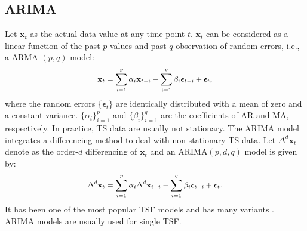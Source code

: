 \documentclass[letterpaper]{article} %
\numberwithin{theorem}{section}
\begin{document}
\subsection{ARIMA}

Let  $\mathbf x_t$ as the actual data value at any time point  $t$.   $\mathbf x_t$ can be considered as a linear function of the past $p$  values and  past  $q$ observation of random errors, i.e., a   ARMA $(p,q)$ model:  
\begin{equation}\label{eq:arma} 
\small
\begin{aligned}
\mathbf x_t = \sum_{i=1}^{p}\alpha_i \mathbf x_{t-i} -  \sum_{i=1}^{q}  \beta_i \boldsymbol  \epsilon_{t-i}   +  \boldsymbol \epsilon_t,  
\end{aligned}  
\end{equation}
where  the  random errors $\{\boldsymbol \epsilon_t\}$ are identically distributed with a mean of zero and a constant variance. 
$\{\alpha_i\}_{i=1}^{p}$ and $ \{\beta_i \}_{i=1}^{q}$ are the coefficients  of AR and MA, respectively.  
In practice, TS data are usually not  stationary. The ARIMA model integrates a differencing method to deal with non-stationary TS data. 
Let  $\Delta^d \mathbf x_t $ denote as the  order-$d$  differencing  of $ \mathbf x_t$ and  an ARIMA$(p,d,q)$ model is given by:
\begin{equation}\label{eq:arima} 
\small 
\begin{aligned}
\Delta^d  \mathbf x_t = \sum_{i=1}^{p}\alpha_i \Delta^d  \mathbf x_{t-i} -  \sum_{i=1}^{q}  \beta_i \boldsymbol  \epsilon_{t-i}   +  \boldsymbol \epsilon_t.  
\end{aligned} 
\end{equation}
It  has been one of the most popular TSF models and has  many variants  \cite{zhang2003time,khashei2011novel,liu2016online}.  ARIMA models are usually used  for   single  TSF.
\end{document}

